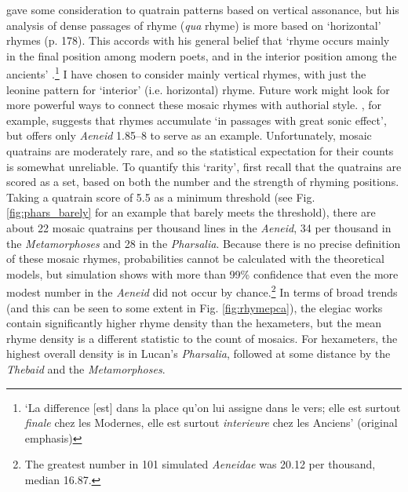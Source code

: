 \documentclass[twocolumn, switch]{article} %
\begin{document}
  gave some consideration to quatrain
patterns based on vertical assonance, but his analysis of dense passages of
rhyme (\emph{qua} rhyme) is more based on `horizontal' rhymes (p. 178). This
accords with his general belief that `rhyme occurs mainly in the final
position among modern poets, and in the interior position among the ancients'
\cite[175]{herescu_poesie_1960}.\footnote{
  `La difference [est] dans la place qu'on lui assigne dans le vers; elle est
  surtout \emph{finale} chez les Modernes, elle est surtout \emph{interieure}
  chez les Anciens' (original emphasis)
}
I have chosen to consider mainly vertical rhymes, with just the leonine
pattern for `interior' (i.e. horizontal) rhyme. Future work might look for
more powerful ways to connect these mosaic rhymes with authorial style.
, for example, suggests that rhymes accumulate
`in passages with great sonic effect', but offers only \emph{Aeneid} 1.85--8
to serve as an example. Unfortunately, mosaic quatrains are moderately rare,
and so the statistical expectation for their counts is somewhat unreliable. To
quantify this `rarity', first recall that the quatrains are scored as a set,
based on both the number and the strength of rhyming positions. Taking a
quatrain score of 5.5 as a minimum threshold (see Fig. \ref{fig:phars_barely}
for an example that barely meets the threshold), there are about 22 mosaic
quatrains per thousand lines in the \emph{Aeneid}, 34 per thousand in the
\emph{Metamorphoses} and 28 in the \emph{Pharsalia}. Because there is no
precise definition of these mosaic rhymes, probabilities cannot be calculated
with the theoretical models, but simulation shows with more than 99\%
confidence that even the more modest number in the \emph{Aeneid} did not occur
by chance.\footnote{
  The greatest number in 101 simulated \emph{Aeneidae} was 20.12 per thousand,
  median 16.87.
}
In terms of broad trends (and this can be seen to some extent in Fig.
\ref{fig:rhymepca}), the elegiac works contain significantly higher rhyme
density than the hexameters, but the mean rhyme density is a different
statistic to the count of mosaics. For hexameters, the highest overall density
is in Lucan's \emph{Pharsalia}, followed at some distance by the
\emph{Thebaid} and the \emph{Metamorphoses}.
\end{document}
